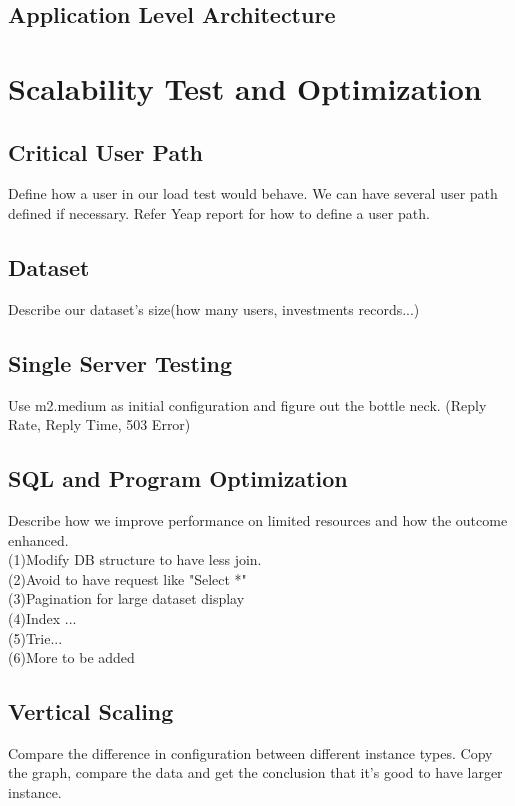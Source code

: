 \documentclass[dvips,12pt]{article}
\begin{document}
\subsection{Application Level Architecture}

\newpage

\section { Scalability Test and Optimization}
\subsection{Critical User Path}
Define how a user in our load test would behave. We can have several user path defined if necessary. Refer Yeap report for how to define a user path.

\subsection{Dataset}
Describe our dataset's size(how many users, investments records...) \\

\subsection{Single Server Testing}
Use m2.medium as initial configuration and figure out the bottle neck. (Reply Rate, Reply Time, 503 Error)

\subsection{SQL and Program Optimization}
Describe how we improve performance on limited resources and how the outcome enhanced.\\
(1)Modify DB structure to have less join. \\
(2)Avoid to have request like "Select *"\\
(3)Pagination for large dataset display \\
(4)Index ...\\
(5)Trie...\\
(6)More to be added

\subsection{Vertical Scaling}
Compare the difference in configuration between different instance types. Copy the graph, compare the data and get the conclusion that it's good to have larger instance.
\end{document}
